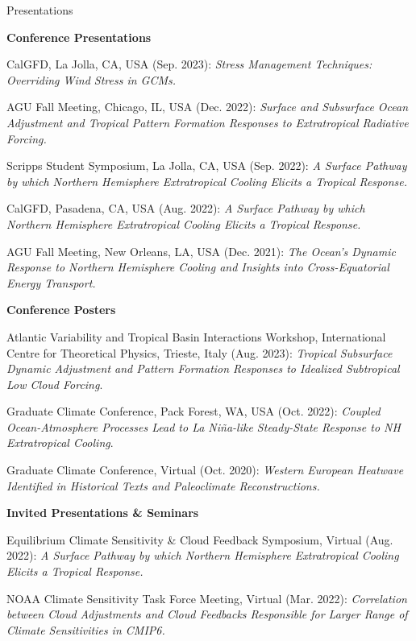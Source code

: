 \documentclass{resume} %
\begin{document}
\begin{rSection}{Presentations}

\textbf{Conference Presentations}
\begin{etaremune}
\item CalGFD, La Jolla, CA, USA (Sep. 2023): \textit{Stress Management Techniques: Overriding Wind Stress in GCMs.} 
\item AGU Fall Meeting, Chicago, IL, USA (Dec. 2022): \textit{Surface and Subsurface Ocean Adjustment and Tropical Pattern Formation Responses to Extratropical Radiative Forcing.} 
\item Scripps Student Symposium, La Jolla, CA, USA (Sep. 2022): \textit{A Surface Pathway by which Northern Hemisphere Extratropical Cooling Elicits a Tropical Response.} 
\item CalGFD, Pasadena, CA, USA (Aug. 2022): \textit{A Surface Pathway by which Northern Hemisphere Extratropical Cooling Elicits a Tropical Response.} 
\item AGU Fall Meeting, New Orleans, LA, USA (Dec. 2021): \textit{The Ocean's Dynamic Response to Northern Hemisphere Cooling and Insights into Cross-Equatorial Energy Transport.} 
\end{etaremune}

\textbf{Conference Posters}
\begin{etaremune}
\item Atlantic Variability and Tropical Basin Interactions Workshop, International Centre for Theoretical Physics, Trieste, Italy (Aug. 2023): \textit{Tropical Subsurface Dynamic Adjustment and Pattern Formation Responses to Idealized Subtropical Low Cloud Forcing}.
\item Graduate Climate Conference, Pack Forest, WA, USA (Oct. 2022): \textit{Coupled Ocean-Atmosphere Processes Lead to La Ni\~{n}a-like Steady-State Response to NH Extratropical Cooling}.
\item Graduate Climate Conference, Virtual (Oct. 2020): \textit{Western European Heatwave Identified in Historical Texts and Paleoclimate Reconstructions.} 
\end{etaremune}

\textbf{Invited Presentations \& Seminars}
\begin{etaremune}
\item Equilibrium Climate Sensitivity \& Cloud Feedback Symposium, Virtual (Aug. 2022): \textit{A Surface Pathway by which Northern Hemisphere Extratropical Cooling Elicits a Tropical Response.}
\item NOAA Climate Sensitivity Task Force Meeting, Virtual (Mar. 2022): \textit{Correlation between Cloud Adjustments and Cloud Feedbacks Responsible for Larger Range of Climate Sensitivities in CMIP6.} 
\end{etaremune}

\end{rSection}
\end{document}
